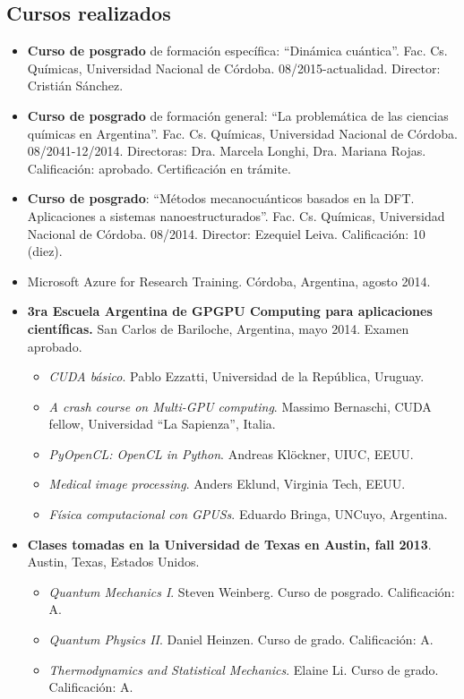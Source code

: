 \documentclass[10pt]{article}
\begin{document}
\subsection{Cursos realizados}
 \begin{itemize}
  \item {\bf Curso de posgrado} de formación específica: ``Dinámica cuántica''. Fac. Cs. Químicas, Universidad Nacional de Córdoba. 08/2015-actualidad. Director: Cristián Sánchez. 
  \item {\bf Curso de posgrado} de formación general: ``La problemática de las ciencias químicas en Argentina''. Fac. Cs. Químicas, Universidad Nacional de Córdoba. 08/2041-12/2014. Directoras: Dra. Marcela Longhi, Dra. Mariana Rojas. Calificación: aprobado. Certificación en trámite.
  \item {\bf Curso de posgrado}: ``Métodos mecanocuánticos basados en la DFT. Aplicaciones a sistemas nanoestructurados''. Fac. Cs. Químicas, Universidad Nacional de Córdoba. 08/2014. Director: Ezequiel Leiva. Calificación: 10 (diez).
  \item {Microsoft Azure for Research Training.} Córdoba, Argentina, agosto 2014. 
  \item {\bf 3ra Escuela Argentina de GPGPU Computing para aplicaciones científicas.} San Carlos de Bariloche, Argentina, mayo 2014. Examen aprobado.
   \begin{itemize}
   \item {\it CUDA básico}. Pablo Ezzatti, Universidad de la República, Uruguay. 
   \item {\it A crash course on Multi-GPU computing}. Massimo Bernaschi, CUDA fellow, Universidad ``La Sapienza'', Italia.
   \item {\it PyOpenCL: OpenCL in Python}. Andreas Klöckner, UIUC, EEUU.
   \item {\it Medical image processing}. Anders Eklund, Virginia Tech, EEUU.
   \item {\it Física computacional con GPUSs}. Eduardo Bringa, UNCuyo, Argentina.
   \end{itemize}
  \item {\bf Clases tomadas en la Universidad de Texas en Austin, fall 2013}. Austin, Texas, Estados Unidos.
   \begin{itemize}
    \item {\it Quantum Mechanics I}. Steven Weinberg. Curso de posgrado. Calificación: A.
    \item {\it Quantum Physics II}. Daniel Heinzen. Curso de grado. Calificación: A.
    \item {\it Thermodynamics and Statistical Mechanics}. Elaine Li. Curso de grado. Calificación: A.

\end{itemize}
\end{itemize}
\end{document}
